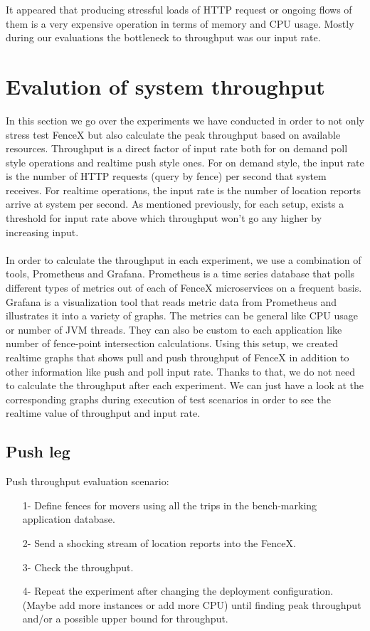 \documentclass[a4]{report}
\begin{document}
    It appeared that producing stressful loads of HTTP request or ongoing flows of them is a very expensive operation
    in terms of memory and CPU usage.
    Mostly during our evaluations the bottleneck to throughput was our input rate.


    \section{Evalution of system throughput}
    In this section we go over the experiments we have conducted in order to not only stress test FenceX but also
    calculate the peak throughput based on available resources.
    Throughput is a direct factor of input rate both for on demand poll style operations and realtime push style ones.
    For on demand style, the input rate is the number of HTTP requests (query by fence) per second that system receives.
    For realtime operations, the input rate is the number of location reports arrive at system per second.
    As mentioned previously, for each setup, exists a threshold for input rate above which throughput won't go any
    higher by increasing input.

    \paragraph{}
    In order to calculate the throughput in each experiment, we use a combination of tools, Prometheus and
    Grafana\cite{grafana}.
    Prometheus is a time series database that polls different types of metrics out of each of FenceX microservices on
    a frequent basis.
    Grafana is a visualization tool that reads metric data from Prometheus and illustrates it into a variety of graphs.
    The metrics can be general like CPU usage or number of JVM threads.
    They can also be custom to each application like number of fence-point intersection calculations.
    Using this setup, we created realtime graphs that shows pull and push throughput of FenceX in addition to other
    information like push and poll input rate.
    Thanks to that, we do not need to calculate the throughput after each experiment.
    We can just have a look at the corresponding graphs during execution of test scenarios in order to see the realtime
    value of throughput and input rate.

    \subsection{Push leg}
    Push throughput evaluation scenario:
    \begin{itemize}
        \item[1-] Define fences for movers using all the trips in the bench-marking application database.
        \item[2-] Send a shocking stream of location reports into the FenceX.
        \item[3-] Check the throughput.
        \item[4-] Repeat the experiment after changing the deployment configuration. (Maybe add more instances or add
        more CPU) until finding peak throughput and/or a possible upper bound for throughput.
    \end{itemize}
\end{document}
